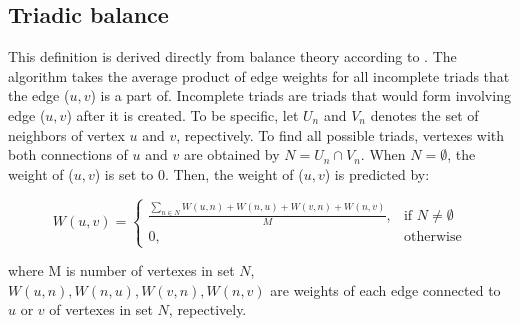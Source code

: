 \subsection{Triadic balance}
This definition is derived directly from
balance theory according to \cite{}. The algorithm takes the average product of edge weights for all incomplete triads
that the edge ($u,v$) is a part of. Incomplete triads are triads that would form involving
edge ($u,v$) after it is created. To be specific, let $U_n$ and $V_n$ denotes the set of
neighbors of vertex $u$ and $v$, repectively. To find all possible triads, vertexes with
both connections of $u$ and $v$ are obtained by $N = U_n \cap V_n$. When $N = \emptyset$, 
the weight of ($u,v$) is set to 0. Then, the weight of ($u,v$)
is predicted by:

\begin{equation}
W(u,v) = 
\begin{cases}
\frac{\sum_{n\in N}W(u,n)+W(n,u)+W(v,n)+W(n,v)}{M}, & \text{if $N \neq \emptyset$} \\
0, & \text{otherwise}
\end{cases}
\end{equation}

where M is number of vertexes in set $N$, $W(u,n), W(n,u), W(v,n), W(n,v)$ are weights of each edge connected
to $u$ or $v$ of vertexes in set $N$, repectively.